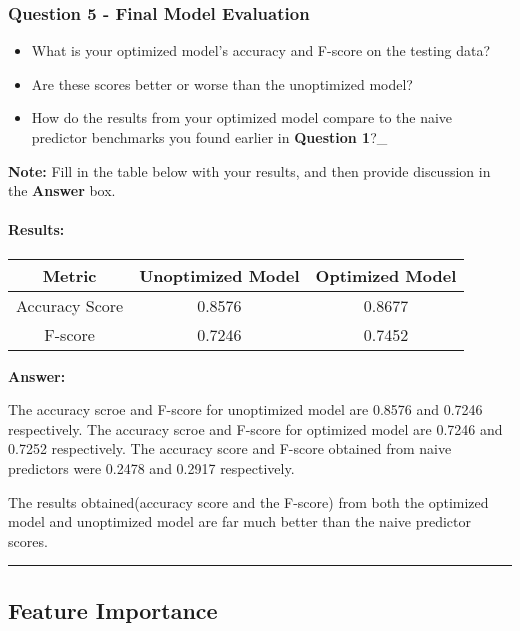 \documentclass[11pt]{article}
\providecommand{\tightlist}{%
      \setlength{\itemsep}{0pt}\setlength{\parskip}{0pt}}
\begin{document}
    \subsubsection{Question 5 - Final Model
Evaluation}\label{question-5---final-model-evaluation}

\begin{itemize}
\tightlist
\item
  What is your optimized model's accuracy and F-score on the testing
  data?
\item
  Are these scores better or worse than the unoptimized model?
\item
  How do the results from your optimized model compare to the naive
  predictor benchmarks you found earlier in \textbf{Question 1}?\_
\end{itemize}

\textbf{Note:} Fill in the table below with your results, and then
provide discussion in the \textbf{Answer} box.

    \paragraph{Results:}\label{results}

\begin{longtable}[]{@{}ccc@{}}
\toprule
Metric & Unoptimized Model & Optimized Model\tabularnewline
\midrule
\endhead
Accuracy Score & 0.8576 & 0.8677\tabularnewline
F-score & 0.7246 & 0.7452\tabularnewline
\bottomrule
\end{longtable}

    \textbf{Answer: }

The accuracy scroe and F-score for unoptimized model are 0.8576 and
0.7246 respectively. The accuracy scroe and F-score for optimized model
are 0.7246 and 0.7252 respectively. The accuracy score and F-score
obtained from naive predictors were 0.2478 and 0.2917 respectively.

The results obtained(accuracy score and the F-score) from both the
optimized model and unoptimized model are far much better than the naive
predictor scores.

    \begin{center}\rule{0.5\linewidth}{\linethickness}\end{center}

\subsection{Feature Importance}\label{feature-importance}
\end{document}
